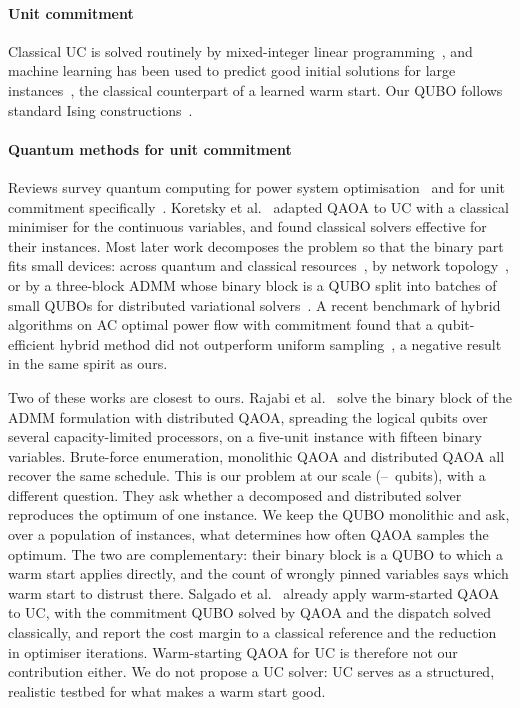 \paragraph{Unit commitment} Classical UC is solved routinely by mixed-integer linear programming~\cite{carrion2006uc}, and machine learning has been used to predict good initial solutions for large instances~\cite{xavier2021learning}, the classical counterpart of a learned warm start. Our QUBO follows standard Ising constructions~\cite{lucas2014ising}.

\paragraph{Quantum methods for unit commitment} Reviews survey quantum computing for power system optimisation~\cite{morstyn2024joule} and for unit commitment specifically~\cite{hasanzadeh2026survey}. Koretsky et al.~\cite{koretsky2021qaoauc} adapted QAOA to UC with a classical minimiser for the continuous variables, and found classical solvers effective for their instances. Most later work decomposes the problem so that the binary part fits small devices: across quantum and classical resources~\cite{nikmehr2022quc}, by network topology~\cite{zhou2025psi}, or by a three-block ADMM whose binary block is a QUBO split into batches of small QUBOs for distributed variational solvers~\cite{hasanzadeh2025d2uc}. A recent benchmark of hybrid algorithms on AC optimal power flow with commitment found that a qubit-efficient hybrid method did not outperform uniform sampling~\cite{gaidai2026benchmark}, a negative result in the same spirit as ours.

Two of these works are closest to ours. Rajabi et al.~\cite{rajabi2026dqaoa} solve the binary block of the ADMM formulation with distributed QAOA, spreading the logical qubits over several capacity-limited processors, on a five-unit instance with fifteen binary variables. Brute-force enumeration, monolithic QAOA and distributed QAOA all recover the same schedule. This is our problem at our scale (\NLtwo--\NLfour\ qubits), with a different question. They ask whether a decomposed and distributed solver reproduces the optimum of one instance. We keep the QUBO monolithic and ask, over a population of instances, what determines how often QAOA samples the optimum. The two are complementary: their binary block is a QUBO to which a warm start applies directly, and the count of wrongly pinned variables says which warm start to distrust there. Salgado et al.~\cite{salgado2024hybrid} already apply warm-started QAOA to UC, with the commitment QUBO solved by QAOA and the dispatch solved classically, and report the cost margin to a classical reference and the reduction in optimiser iterations. Warm-starting QAOA for UC is therefore not our contribution either. We do not propose a UC solver: UC serves as a structured, realistic testbed for what makes a warm start good.

